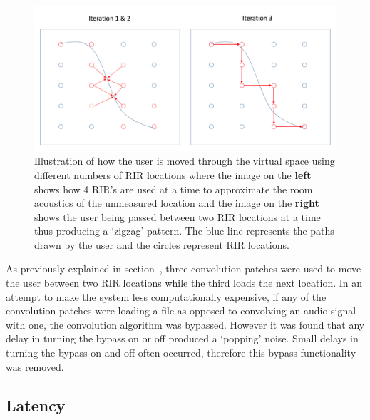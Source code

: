 \documentclass[../../main.tex]{subfiles}
\begin{document}
		\begin{figure}[H]
			\centerline{\includegraphics[scale = 0.4]{Sections/Implementation/Max/images/Max/iterationMovement.png}}
			\caption{Illustration of how the user is moved through the virtual space using different numbers of \ac{RIR} locations where the image on the \textbf{left} shows how 4 \ac{RIR}'s are used at a time to approximate the room acoustics of the unmeasured location and the image on the \textbf{right} shows the user being passed between two \ac{RIR} locations at a time thus producing a `zigzag' pattern. The blue line represents the paths drawn by the user and the circles represent \ac{RIR} locations.}
			\label{iterationMovement}
		\end{figure}

		As previously explained in section~, three convolution patches were used to move the user between two \ac{RIR} locations while the third loads the next location. In an attempt to make the system less computationally expensive, if any of the convolution patches were loading a file as opposed to convolving an audio signal with one, the convolution algorithm was bypassed. However it was found that any delay in turning the bypass on or off produced a `popping' noise. Small delays in turning the bypass on and off often occurred, therefore this bypass functionality was removed.


	\subsection{Latency}
		\label{max:latency}
\end{document}
